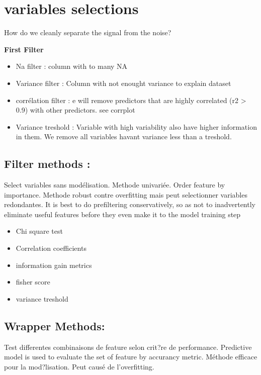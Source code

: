 \documentclass[]{book}
\providecommand{\tightlist}{%
  \setlength{\itemsep}{0pt}\setlength{\parskip}{0pt}}
\theoremstyle{definition}
\theoremstyle{definition}
\theoremstyle{definition}
\theoremstyle{remark}
\begin{document}
\section{variables selections}\label{variables-selections}

How do we cleanly separate the signal from the noise?

\textbf{First Filter}

\begin{itemize}
\tightlist
\item
  Na filter : column with to many NA
\item
  Variance filter : Column with not enought variance to explain dataset
\item
  corrélation filter : e will remove predictors that are highly
  correlated (r2 \textgreater{} 0.9) with other predictors. see corrplot
\item
  Variance treshold : Variable with high variability also have higher
  information in them. We remove all variables havant variance less than
  a treshold.
\end{itemize}

\subsection{Filter methods :}\label{filter-methods}

Select variables sans modélisation. Methode univariée. Order feature by
importance. Methode robust contre overfitting mais peut selectionner
variables redondantes. It is best to do prefiltering conservatively, so
as not to inadvertently eliminate useful features before they even make
it to the model training step

\begin{itemize}
\tightlist
\item
  Chi square test
\item
  Correlation coefficients
\item
  information gain metrics
\item
  fisher score
\item
  variance treshold
\end{itemize}

\subsection{Wrapper Methods:}\label{wrapper-methods}

Test differentes combinaisons de feature selon crit?re de performance.
Predictive model is used to evaluate the set of feature by accurancy
metric. Méthode efficace pour la mod?lisation. Peut causé de
l'overfitting.
\end{document}
